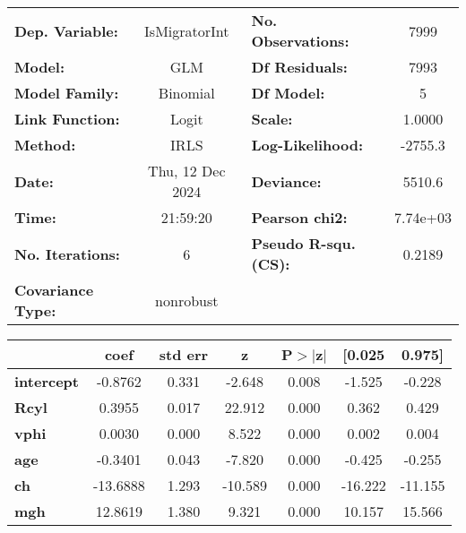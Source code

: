\begin{center}
\begin{tabular}{lclc}
\toprule
\textbf{Dep. Variable:}   &  IsMigratorInt   & \textbf{  No. Observations:  } &     7999    \\
\textbf{Model:}           &       GLM        & \textbf{  Df Residuals:      } &     7993    \\
\textbf{Model Family:}    &     Binomial     & \textbf{  Df Model:          } &        5    \\
\textbf{Link Function:}   &      Logit       & \textbf{  Scale:             } &    1.0000   \\
\textbf{Method:}          &       IRLS       & \textbf{  Log-Likelihood:    } &   -2755.3   \\
\textbf{Date:}            & Thu, 12 Dec 2024 & \textbf{  Deviance:          } &    5510.6   \\
\textbf{Time:}            &     21:59:20     & \textbf{  Pearson chi2:      } &  7.74e+03   \\
\textbf{No. Iterations:}  &        6         & \textbf{  Pseudo R-squ. (CS):} &   0.2189    \\
\textbf{Covariance Type:} &    nonrobust     & \textbf{                     } &             \\
\bottomrule
\end{tabular}
\begin{tabular}{lcccccc}
                   & \textbf{coef} & \textbf{std err} & \textbf{z} & \textbf{P$> |$z$|$} & \textbf{[0.025} & \textbf{0.975]}  \\
\midrule
\textbf{intercept} &      -0.8762  &        0.331     &    -2.648  &         0.008        &       -1.525    &       -0.228     \\
\textbf{Rcyl}      &       0.3955  &        0.017     &    22.912  &         0.000        &        0.362    &        0.429     \\
\textbf{vphi}      &       0.0030  &        0.000     &     8.522  &         0.000        &        0.002    &        0.004     \\
\textbf{age}       &      -0.3401  &        0.043     &    -7.820  &         0.000        &       -0.425    &       -0.255     \\
\textbf{ch}        &     -13.6888  &        1.293     &   -10.589  &         0.000        &      -16.222    &      -11.155     \\
\textbf{mgh}       &      12.8619  &        1.380     &     9.321  &         0.000        &       10.157    &       15.566     \\
\bottomrule
\end{tabular}
\end{center}